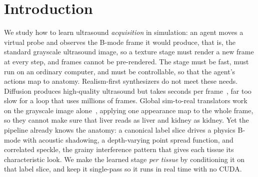 \documentclass[runningheads]{llncs}
\begin{document}
\section{Introduction}
We study how to learn ultrasound \emph{acquisition} in simulation: an agent moves a virtual probe and observes the B-mode frame it would produce, that is, the standard grayscale ultrasound image, so a texture stage must render a new frame at every step, and frames cannot be pre-rendered. 
The stage must be fast, must run on an ordinary computer, and must be controllable, so that the agent's actions map to anatomy. 
Realism-first synthesizers do not meet these needs. Diffusion produces high-quality ultrasound but takes seconds per frame~\cite{stojanovski2023echofromnoise}, far too slow for a loop that uses millions of frames. 
Global sim-to-real translators work on the grayscale image alone~\cite{song2024scyclegan}, applying one appearance map to the whole frame, so they cannot make sure that liver reads as liver and kidney as kidney. 
Yet the pipeline already knows the anatomy: a canonical label slice drives a physics B-mode with acoustic shadowing, a depth-varying point spread function, and correlated speckle, the grainy interference pattern that gives each tissue its characteristic look. We make the learned stage \emph{per tissue} by conditioning it on that label slice, and keep it single-pass so it runs in real time with no CUDA. 
\end{document}
